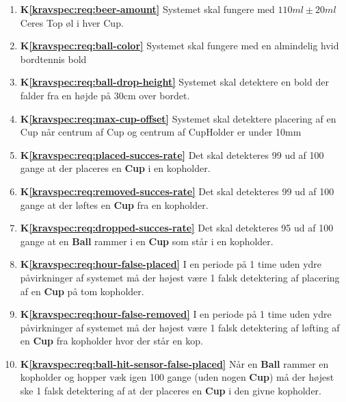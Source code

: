 \documentclass[Modultest/Modultest_main.tex]{subfiles}
\begin{document}
\begin{enumerate}
    \item \textbf{K\ref{kravspec:req:beer-amount}} Systemet skal fungere med $110\si{ml} \pm 20\si{ml}$ Ceres Top øl i hver Cup.
    
    \item  \textbf{K\ref{kravspec:req:ball-color}} Systemet skal fungere med en almindelig hvid bordtennis bold
    
    \item  \textbf{K\ref{kravspec:req:ball-drop-height}} Systemet skal detektere en bold der falder fra en højde på 30cm over bordet.
    
    \item \textbf{K\ref{kravspec:req:max-cup-offset}} Systemet skal detektere placering af en Cup når centrum af Cup og centrum af CupHolder er under 10mm
    
    \item  \textbf{K\ref{kravspec:req:placed-succes-rate}} Det skal detekteres 99 ud af 100 gange at der placeres en \textbf{Cup} i en kopholder. 
    
    \item \textbf{K\ref{kravspec:req:removed-succes-rate}} Det skal detekteres 99 ud af 100 gange at der løftes en \textbf{Cup} fra en kopholder. 
    
    \item \textbf{K\ref{kravspec:req:dropped-succes-rate}} Det skal detekteres 95 ud af 100 gange at en \textbf{Ball} rammer i  en \textbf{Cup} som står i en kopholder.
    
    \item \textbf{K\ref{kravspec:req:hour-false-placed}} I en periode på 1 time uden ydre påvirkninger af systemet må der højest være 1 falsk detektering af placering af en \textbf{Cup} på tom kopholder.
    
    \item \textbf{K\ref{kravspec:req:hour-false-removed}} I en periode på 1 time uden ydre påvirkninger af systemet må der højest være 1 falsk detektering af løfting af en \textbf{Cup} fra kopholder hvor der står en kop.
    
    \item \textbf{K\ref{kravspec:req:ball-hit-sensor-false-placed}} Når en \textbf{Ball} rammer en kopholder og hopper væk igen 100 gange (uden nogen \textbf{Cup}) må der højest ske 1 falsk detektering af at der placeres en \textbf{Cup} i den givne kopholder.
\end{enumerate}
\end{document}
